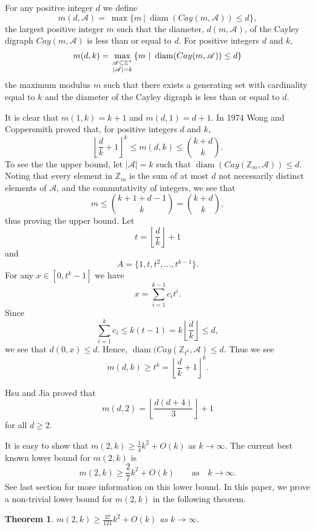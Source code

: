 \documentclass[11pt]{article}
\newtheorem{theorem}{Theorem}
\theoremstyle{definition}
\def\Z{\mbox{$\mathbb Z$}}
\def\diam{\operatorname{diam}}
\begin{document}
For any positive integer $d$ we define
\[
m(d,\mathscr{A}) =\ \max\{m \  \vert \  \diam(Cay(m,\mathscr{A})) \leq d\},
\]
the largest positive integer $m$ such that the diameter, $d(m,\mathscr{A})$, of the Cayley digraph $Cay(m,\mathscr{A})$ is less than or equal to $d$. For positive integers $d$ and $k$,
\[
m(d, k) = \max_{\scriptstyle \mathscr{A}\subseteq\mathbb Z^{+}\atop\scriptstyle |\mathscr{A}|=k}\{m\  |\  \diam(Cay(m,\mathscr{A})) \leq d\}
\]
the maximum modulus $m$ such that there exists a generating set with cardinality equal to $k$ and the diameter of the Cayley digraph is less than or equal to $d$. 

It is clear that $m(1,k) = k+1$ and $m(d,1) = d+1$.
In 1974 Wong and Coppersmith \cite{Wong-Coppersmith:1974} proved that, for positive integers $d$ and $k$,
\[
\left \lfloor \frac dk + 1 \right \rfloor^k \leq m(d, k) \leq  \binom{k + d}k . 
\]
To see the the upper bound, let $|\mathscr{A}| = k$ such that $\diam(Cay(\Z_m, \mathscr{A})) \leq d$. Noting that every element in $\Z_m$ is the sum of at most $d$ not necessarily distinct elements of $\mathscr{A}$, and the commutativity of integers,  we see that
\[
m \leq \binom{k + 1 + d - 1}k = \binom{k + d}k,
\] 
thus proving the upper bound.
Let
\[t = \left \lfloor \frac{d}{k} \right \rfloor + 1\]
and 
\[A = \{1, t, t^2, ... , t^{k-1}\}.\]
For any $x \in [0, t^k -1]$ we have
\[x = \sum_{i=1}^{k - 1}c_it^i.\]
Since 
\[
\sum_{i=1}^{k} c_i \leq k(t - 1) = k \left \lfloor \frac dk \right \rfloor  \leq d,
\]
we see that $d(0, x) \leq d$. Hence, $\diam(Cay(\Z_{t^k}, \mathscr{A}) \leq d$. Thus we see
\[m(d, k) \geq t^k  = \left \lfloor \frac dk + 1 \right \rfloor^k.
\]

Hsu and Jia \cite{JiaHsu} proved that 
\begin{equation}\label{eqn:m(d,2)>27}
m(d,2) =\left \lfloor \frac{d(d+4)}{3}\right \rfloor+1
\end{equation}
for all $d\geq2$. 

It is easy to show that $m(2,k)\ge \frac14k^{2}+O(k)$ as $k\to\infty$.  The current best known lower bound for $m(2,k)$ is
\[
m(2,k)\ge\frac27k^{2}+O(k)\qquad\text{as}\quad k\to\infty.
\]
See last section for more information on this lower bound.
In this paper, we prove a non-trivial lower bound for $m(2,k)$ in the following theorem.

\begin{theorem}\label{thm:m(2k)}
$\displaystyle m(2,k) \geq \frac{37}{121}k^2 + O(k)$  as $ k \to \infty$.
\end{theorem}
\end{document}
